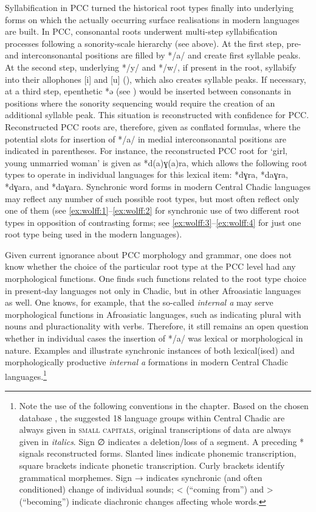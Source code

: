 \documentclass[output=paper]{langscibook}
\begin{document}
Syllabification in PCC turned the historical root types finally into underlying forms on which the actually occurring surface realisations in modern languages are built. In PCC, consonantal roots underwent multi-step syllabification processes following a sonority-scale hierarchy (see above). At the first step, pre- and interconsonantal positions are filled by */a/ and create first syllable peaks. At the second step, underlying */y/ and */w/, if present in the root, syllabify into their allophones [i] and [u] (), which also creates syllable peaks. If necessary, at a third step, epenthetic *ə (see ) would be inserted between consonants in positions where the sonority sequencing would require the creation of an additional syllable peak. This situation is reconstructed with confidence for PCC. Reconstructed PCC roots are, therefore, given as conflated formulas, where the potential slots for insertion of */a/ in medial interconsonantal positions are indicated in parentheses. For instance, the reconstructed PCC root for ‘girl, young unmarried woman’ is given as *d(a)ɣ(a)ra, which allows the following root types to operate in individual languages for this lexical item: *dɣra, *daɣra, *dɣara, and *daɣara. Synchronic word forms in modern Central Chadic languages may reflect any number of such possible root types, but most often reflect only one of them (see \ref{ex:wolff:1}--\ref{ex:wolff:2} for synchronic use of two different root types in opposition of contrasting forms; see \ref{ex:wolff:3}--\ref{ex:wolff:4} for just one root type being used in the modern languages).  

Given current ignorance about PCC morphology and grammar, one does not know whether the choice of the particular root type at the PCC level had any morphological functions. One finds such functions related to the root type choice in present-day languages not only in Chadic, but in other Afroasiatic languages as well. One knows, for example, that the so-called \textit{internal a} may serve morphological functions in Afroasiatic languages, such as indicating plural with nouns and pluractionality with verbs. Therefore, it still remains an open question whether in individual cases the insertion of */a/ was lexical or morphological in nature. Examples  and  illustrate synchronic instances of both lexical(ised) and morphologically productive \textit{internal a} formations in modern Central Chadic lan\-guages.\footnote{Note
    the use of the following conventions in the chapter. Based on the chosen database \citep{Gravina2015}, the suggested 18 language groups within Central Chadic are always given in \textsc{small} \textsc{capitals}, original transcriptions of data are always given in \textit{italics}. Sign ∅ indicates a deletion/loss of a segment. A preceding * signals reconstructed forms. Slanted lines indicate phonemic transcription, square brackets indicate phonetic transcription. Curly brackets identify grammatical morphemes. Sign → indicates synchronic (and often conditioned) change of individual sounds; < (“coming from”) and > (“becoming”) indicate diachronic changes affecting whole words.
}
\end{document}
